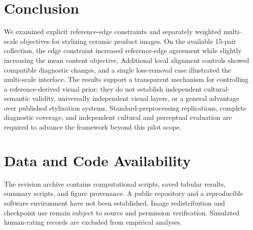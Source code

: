 \section{Conclusion}
\label{sec:conclusion}
We examined explicit reference-edge constraints and separately weighted multi-scale objectives for stylizing ceramic product images. On the available 15-pair collection, the edge constraint increased reference-edge agreement while slightly increasing the mean content objective. Additional local alignment controls showed compatible diagnostic changes, and a single loss-removal case illustrated the multi-scale interface. The results support a transparent mechanism for controlling a reference-derived visual prior; they do not establish independent cultural-semantic validity, universally independent visual layers, or a general advantage over published stylization systems. Standard-preprocessing replications, complete diagnostic coverage, and independent cultural and perceptual evaluation are required to advance the framework beyond this pilot scope.

\section*{Data and Code Availability}
The revision archive contains computational scripts, saved tabular results, summary scripts, and figure provenance. A public repository and a reproducible software environment have not been established. Image redistribution and checkpoint use remain subject to source and permission verification. Simulated human-rating records are excluded from empirical analyses.
